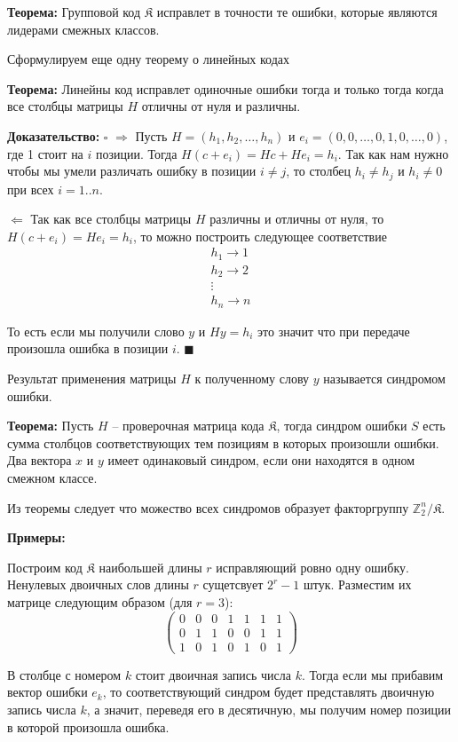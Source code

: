 \documentclass{article}
\newcommand{\THRM}[1] {
    \textbf{Теорема: } #1
}
\newcommand{\PROOF}[1] {
    \textbf{Доказательство: } $\square$ #1 $\blacksquare$
}
\newcommand{\EXMP} {\textbf{Примеры: }}
\begin{document}
    \THRM{Групповой код $\mathfrak{K}$ исправлет в точности те ошибки, которые являются лидерами смежных классов.}

    Сформулируем еще одну теорему о линейных кодах

    \THRM{Линейны код исправлет одиночные ошибки тогда и только тогда когда все столбцы матрицы $H$ отличны от нуля и различны.}

    \PROOF{
        $\Rightarrow$ Пусть $H = (h_1, h_2, \dots , h_n)$ и $e_i = (0, 0, \dots , 0, 1, 0, \dots , 0)$, где 1 стоит на $i$ позиции.
        Тогда $H(c + e_i) = Hc + He_i = h_i$. Так как нам нужно чтобы мы умели различать ошибку в позиции $i \neq j$, то столбец $h_i \neq h_j$ и
        $h_i \neq 0$ при всех $i = 1..n$. 

        $\Leftarrow$ Так как все столбцы матрицы $H$ различны и отличны от нуля, то $H(c + e_i) = He_i = h_i$, то можно построить следующее 
        соответствие 
        $$
        \begin{matrix}
            h_1 \rightarrow 1 \\
            h_2 \rightarrow 2 \\
            \vdots \\
            h_n \rightarrow n
        \end{matrix}
        $$

        То есть если мы получили слово $y$ и $Hy = h_i$ это значит что при передаче произошла ошибка в позиции $i$. 
    }

    Результат применения матрицы $H$ к полученному слову $y$ называется синдромом ошибки.

    \THRM{
        Пусть $H$ -- проверочная матрица кода $\mathfrak{K}$, тогда синдром ошибки $S$ есть сумма столбцов соответствующих тем позициям в 
        которых произошли ошибки. Два вектора $x$ и $y$ имеет одинаковый синдром, если они находятся в одном смежном классе.
    }

    Из теоремы следует что можество всех синдромов образует факторгруппу $\mathbb{Z}_2^n / \mathfrak{K}$.

    \EXMP{
        Построим код $\mathfrak{K}$ наибольшей длины $r$ исправляющий ровно одну ошибку. Ненулевых двоичных слов длины $r$ сущетсвует
        $2^r - 1$ штук. Разместим их матрице следующим образом (для $r = 3$): 
        $$
        \begin{pmatrix}
            0 & 0 & 0 & 1 & 1 & 1 & 1 \\  
            0 & 1 & 1 & 0 & 0 & 1 & 1 \\
            1 & 0 & 1 & 0 & 1 & 0 & 1
        \end{pmatrix}
        $$

        В столбце с номером $k$ стоит двоичная запись числа $k$. Тогда если мы прибавим вектор ошибки $e_k$, то соответствующий синдром
        будет представлять двоичную запись числа $k$, а значит, переведя его в десятичную, мы получим номер позиции в которой произошла 
        ошибка.
    }
\end{document}
